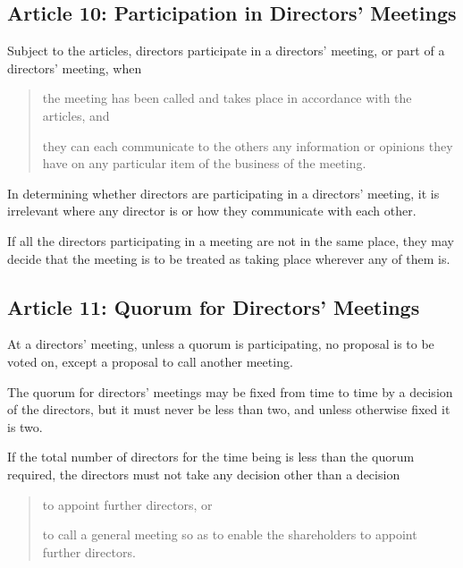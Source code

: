 \documentclass[letterpaper,10pt,english]{sphinxmanual}
\begin{document}
\subsection{Article 10: Participation in Directors’ Meetings}
\label{\detokenize{directors:article-10-participation-in-directors-meetings}}\label{\detokenize{directors:article-10}}
 Subject to the articles, directors participate in a directors’ meeting, or part of a directors’ meeting, when
\begin{quote}

 the meeting has been called and takes place in accordance with the articles, and

 they can each communicate to the others any information or opinions they have on any particular item of the business of the meeting.
\end{quote}

 In determining whether directors are participating in a directors’ meeting, it is irrelevant where any director is or how they communicate with each other.

 If all the directors participating in a meeting are not in the same place, they may decide that the meeting is to be treated as taking place wherever any of them is.


\subsection{Article 11: Quorum for Directors’ Meetings}
\label{\detokenize{directors:article-11-quorum-for-directors-meetings}}\label{\detokenize{directors:article-11}}
 At a directors’ meeting, unless a quorum is participating, no proposal is to be voted on, except a proposal to call another meeting.

 The quorum for directors’ meetings may be fixed from time to time by a decision of the directors, but it must never be less than two, and unless otherwise fixed it is two.

 If the total number of directors for the time being is less than the quorum required, the directors must not take any decision other than a decision
\begin{quote}

 to appoint further directors, or

 to call a general meeting so as to enable the shareholders to appoint further directors.
\end{quote}
\end{document}

